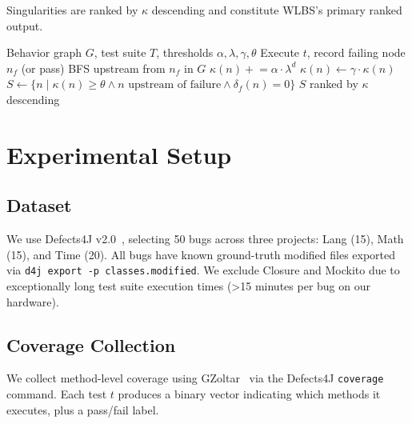 \documentclass[acmtog]{acmart}
\begin{document}
Singularities are ranked by $\kappa$ descending and constitute WLBS's
primary ranked output.

\begin{algorithm}
\caption{WLBS: Curvature Propagation and Singularity Detection}
\begin{algorithmic}[1]
\Require Behavior graph $G$, test suite $T$, thresholds $\alpha,\lambda,\gamma,\theta$
  \State Execute $t$, record failing node $n_f$ (or pass)
    \State BFS upstream from $n_f$ in $G$
      \State $\kappa(n) \mathrel{+}= \alpha \cdot \lambda^d$
    \EndFor
  \Else
      \State $\kappa(n) \leftarrow \gamma \cdot \kappa(n)$
    \EndFor
  \EndIf
\EndFor
\State $S \leftarrow \{n \mid \kappa(n)\geq\theta \wedge n\text{ upstream of failure} \wedge \delta_f(n)=0\}$
\State \Return $S$ ranked by $\kappa$ descending
\end{algorithmic}
\end{algorithm}


\section{Experimental Setup}\label{sec:setup}

\subsection{Dataset}
We use Defects4J v2.0~\cite{just2014defects4j}, selecting 50 bugs across three
projects: Lang (15), Math (15), and Time (20). All bugs
have known ground-truth modified files exported via \texttt{d4j export -p
classes.modified}. We exclude Closure and Mockito due to exceptionally long
test suite execution times (\textgreater{}15 minutes per bug on our hardware).

\subsection{Coverage Collection}
We collect method-level coverage using GZoltar~\cite{campos2012gzoltar} via the
Defects4J \texttt{coverage} command. Each test $t$ produces a binary vector
indicating which methods it executes, plus a pass/fail label.
\end{document}
